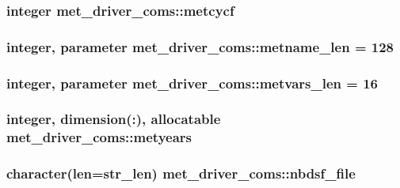\subsubsection[{metcycf}]{\setlength{\rightskip}{0pt plus 5cm}integer met\+\_\+driver\+\_\+coms\+::metcycf}\label{namespacemet__driver__coms_a9a06bc94d2fbf01d6d9ef295ba9f3887}
\hypertarget{namespacemet__driver__coms_a8dc2e2ece34bf7b8bd355e602f477c66}{}
\subsubsection[{metname\+\_\+len}]{\setlength{\rightskip}{0pt plus 5cm}integer, parameter met\+\_\+driver\+\_\+coms\+::metname\+\_\+len = 128}\label{namespacemet__driver__coms_a8dc2e2ece34bf7b8bd355e602f477c66}
\hypertarget{namespacemet__driver__coms_af6adda2378b0db677d6ea2016d8cf4b3}{}
\subsubsection[{metvars\+\_\+len}]{\setlength{\rightskip}{0pt plus 5cm}integer, parameter met\+\_\+driver\+\_\+coms\+::metvars\+\_\+len = 16}\label{namespacemet__driver__coms_af6adda2378b0db677d6ea2016d8cf4b3}
\hypertarget{namespacemet__driver__coms_af128086aff438c098cbb171df11b5b50}{}
\subsubsection[{metyears}]{\setlength{\rightskip}{0pt plus 5cm}integer, dimension(\+:), allocatable met\+\_\+driver\+\_\+coms\+::metyears}\label{namespacemet__driver__coms_af128086aff438c098cbb171df11b5b50}
\hypertarget{namespacemet__driver__coms_a8f3d2674e75157c654a61aa253ba5ac7}{}
\subsubsection[{nbdsf\+\_\+file}]{\setlength{\rightskip}{0pt plus 5cm}character(len=str\+\_\+len) met\+\_\+driver\+\_\+coms\+::nbdsf\+\_\+file}\label{namespacemet__driver__coms_a8f3d2674e75157c654a61aa253ba5ac7}
\hypertarget{namespacemet__driver__coms_a8adb3cddd748a6ba29fb75dd69ca54c7}{}
